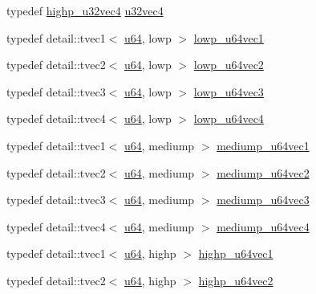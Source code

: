 \begin{CompactItemize}
\item 
typedef \hyperlink{group__gtc__type__precision_g9418a8d549d344d4f7b7158771a2fdfe}{highp\_\-u32vec4} \hyperlink{group__gtc__type__precision_g7e4574f8327a2f576baf2617343d0170}{u32vec4}
\item 
typedef detail::tvec1$<$ \hyperlink{group__gtc__type__precision_g71cedd4972f9cb1a5e14dfe5ab83ecd7}{u64}, lowp $>$ \hyperlink{group__gtc__type__precision_gcd97dc5e92d0e2f6f6d62a5160508e2a}{lowp\_\-u64vec1}
\item 
typedef detail::tvec2$<$ \hyperlink{group__gtc__type__precision_g71cedd4972f9cb1a5e14dfe5ab83ecd7}{u64}, lowp $>$ \hyperlink{group__gtc__type__precision_ge0e7d3ed32e8e79b4f6dd0c9baafcaea}{lowp\_\-u64vec2}
\item 
typedef detail::tvec3$<$ \hyperlink{group__gtc__type__precision_g71cedd4972f9cb1a5e14dfe5ab83ecd7}{u64}, lowp $>$ \hyperlink{group__gtc__type__precision_ga62794e3f055a333a85c0e52376f2429}{lowp\_\-u64vec3}
\item 
typedef detail::tvec4$<$ \hyperlink{group__gtc__type__precision_g71cedd4972f9cb1a5e14dfe5ab83ecd7}{u64}, lowp $>$ \hyperlink{group__gtc__type__precision_g1dc6d791a39dc52ee296a891d5b9b084}{lowp\_\-u64vec4}
\item 
typedef detail::tvec1$<$ \hyperlink{group__gtc__type__precision_g71cedd4972f9cb1a5e14dfe5ab83ecd7}{u64}, mediump $>$ \hyperlink{group__gtc__type__precision_gf4211dc9e211d57b34b45a612b6de193}{mediump\_\-u64vec1}
\item 
typedef detail::tvec2$<$ \hyperlink{group__gtc__type__precision_g71cedd4972f9cb1a5e14dfe5ab83ecd7}{u64}, mediump $>$ \hyperlink{group__gtc__type__precision_g9eda8d6f5be7a2919fb90412535b385f}{mediump\_\-u64vec2}
\item 
typedef detail::tvec3$<$ \hyperlink{group__gtc__type__precision_g71cedd4972f9cb1a5e14dfe5ab83ecd7}{u64}, mediump $>$ \hyperlink{group__gtc__type__precision_g7af0601e6a8ce71bd21ecf67971f5154}{mediump\_\-u64vec3}
\item 
typedef detail::tvec4$<$ \hyperlink{group__gtc__type__precision_g71cedd4972f9cb1a5e14dfe5ab83ecd7}{u64}, mediump $>$ \hyperlink{group__gtc__type__precision_ge25a6609fa377ba1ec983ec32a91f1d4}{mediump\_\-u64vec4}
\item 
typedef detail::tvec1$<$ \hyperlink{group__gtc__type__precision_g71cedd4972f9cb1a5e14dfe5ab83ecd7}{u64}, highp $>$ \hyperlink{group__gtc__type__precision_gb48ca217e1d1cc9aac3d9f037493ae7e}{highp\_\-u64vec1}
\item 
typedef detail::tvec2$<$ \hyperlink{group__gtc__type__precision_g71cedd4972f9cb1a5e14dfe5ab83ecd7}{u64}, highp $>$ \hyperlink{group__gtc__type__precision_gd11667a4764867732a89791ec2a01aeb}{highp\_\-u64vec2}

\end{CompactItemize}
